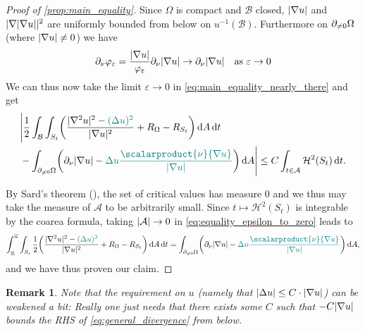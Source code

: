 \documentclass[draft]{amsart}
\newtheorem{remark}[theorem]{Remark}
\newcommand*{\mathcomma}{,}
\newcommand*{\mathfullstop}{.}
\DeclarePairedDelimiter{\parens}{(}{)}
\let\p\parens %
\newcommand*{\goesto}{\to}
\newcommand*{\laplacian}{\Delta}
\DeclarePairedDelimiter{\abs}{\lvert}{\rvert} %
\newcommand{\inverse}[1]{{#1}^{-1}}
\begin{document}
\begin{proof}[Proof of \cref{prop:main_equality}]
    
    Since \( \Omega \) is compact and \( \mathcal{B} \) closed, \( \abs{\nabla u} \) and \( \abs{\nabla\abs{\nabla u}}^2 \) are uniformly bounded from below on \( \inverse{u}(\mathcal{B}) \). Furthermore on \( \partial_{\neq 0}\Omega \) (where \( \abs{\nabla u}\neq 0 \)) we have
    \begin{equation*}
        \partial_\nu \varphi_\varepsilon=\frac{\abs{\nabla u}}{\varphi_\varepsilon}\partial_{\nu}\abs{\nabla u}\goesto \partial_{\nu}\abs{\nabla u}\quad \text{as \( \varepsilon\goesto 0 \)}
    \end{equation*} 
    We can thus now take the limit \( \varepsilon\goesto 0 \) in \cref{eq:main_equality_nearly_there} and get
    \begin{multline}\label{eq:equality_epsilon_to_zero}
        \begin{aligned}[t]
        &\Bigg\lvert\frac{1}{2}\int_{\mathcal{B}}\int_{S_t}\p*{\frac{\abs{\nabla^2 u}^2-\nonHarmonic{(\laplacian u)^2}}{\abs{\nabla u}^2}+R_{\Omega}-R_{S_t}}\odif{A}\odif{t}\\
        &{}-\int_{\nonzeroboundary}\p*{\partial_\nu \abs{\nabla u}-\nonHarmonic{\laplacian u \frac{\scalarproduct{\nu}{\nabla u}}{\abs{\nabla u}}}}\odif{A}\Bigg\rvert\leq C\int_{t\in \mathcal{A}} \mathcal{H}^2(S_t)\odif{t} \mathfullstop
         \end{aligned}
    \end{multline}
    

    By Sard's theorem (\cite{sardMeasureCriticalValues1942}), the set of critical values has measure \( 0 \) and we thus may take the measure of \( \mathcal{A} \) to be arbitrarily small. Since \( t\mapsto \mathcal{H}^2(S_t) \) is integrable by the coarea formula, taking \( \abs{\mathcal{A}}\to 0 \) in \cref{eq:equality_epsilon_to_zero} leads to
    \begin{equation*}
        \int_{\minu}^{\maxu}\int_{S_t}\frac{1}{2}\p*{\frac{\abs{\nabla^2 u}^2-\nonHarmonic{(\laplacian u)^2}}{\abs{\nabla u}^2}+R_{\Omega}-R_{S_t}}\odif{A}\odif{t}=\int_{\nonzeroboundary}\p*{\partial_\nu \abs{\nabla u}-\nonHarmonic{\laplacian u \frac{\scalarproduct{\nu}{\nabla u}}{\abs{\nabla u}}}}\odif{A}\mathcomma
    \end{equation*} 
    and we have thus proven our claim. 
\end{proof}
\begin{remark}
    Note that the requirement on \( u  \) (namely that \( \abs{\laplacian u}\leq C\cdot \abs {\nabla u} \)) can be weakened a bit: Really one just needs that there exists some \( C \) such that \( -C\abs{\nabla u} \) bounds the RHS of \cref{eq:general_divergence} from below.
\end{remark}
\newcommand{\spacetimehessian}{\bar{\nabla}^2}
\end{document}
